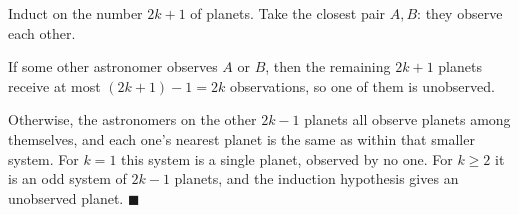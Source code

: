 Induct on the number $2k+1$ of planets. Take the closest pair $A,B$: they observe each other.

If some other astronomer observes $A$ or $B$, then the remaining $2k+1$ planets receive at most $(2k+1)-1=2k$ observations, so one of them is unobserved.

Otherwise, the astronomers on the other $2k-1$ planets all observe planets among themselves, and each one's nearest planet is the same as within that smaller system. For $k=1$ this system is a single planet, observed by no one. For $k\ge2$ it is an odd system of $2k-1$ planets, and the induction hypothesis gives an unobserved planet. $\blacksquare$
